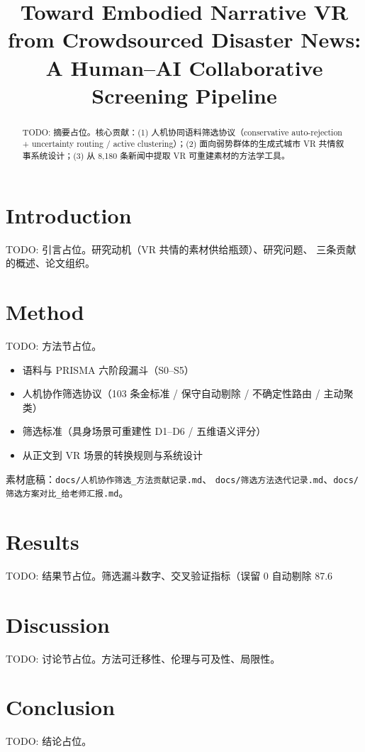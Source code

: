\documentclass[manuscript,anonymous,screen]{acmart}
\title{Toward Embodied Narrative VR from Crowdsourced Disaster News:
       A Human--AI Collaborative Screening Pipeline}
\author{}
\affiliation{}
\begin{document}
\begin{abstract}
TODO: 摘要占位。核心贡献：(1) 人机协同语料筛选协议（conservative auto-rejection
+ uncertainty routing / active clustering）；(2) 面向弱势群体的生成式城市
VR 共情叙事系统设计；(3) 从 8,180 条新闻中提取 VR 可重建素材的方法学工具。
\end{abstract}


\maketitle

\section{Introduction}
TODO: 引言占位。研究动机（VR 共情的素材供给瓶颈）、研究问题、
三条贡献的概述、论文组织。



\section{Method}
TODO: 方法节占位。
\begin{itemize}
  \item 语料与 PRISMA 六阶段漏斗（S0--S5）
  \item 人机协作筛选协议（103 条金标准 / 保守自动剔除 / 不确定性路由 / 主动聚类）
  \item 筛选标准（具身场景可重建性 D1--D6 / 五维语义评分）
  \item 从正文到 VR 场景的转换规则与系统设计
\end{itemize}
素材底稿：\texttt{docs/人机协作筛选\_方法贡献记录.md}、
\texttt{docs/筛选方法迭代记录.md}、\texttt{docs/筛选方案对比\_给老师汇报.md}。

\section{Results}
TODO: 结果节占位。筛选漏斗数字、交叉验证指标（误留 0%
自动剔除 87.6%

\section{Discussion}
TODO: 讨论节占位。方法可迁移性、伦理与可及性、局限性。

\section{Conclusion}
TODO: 结论占位。



\end{document}
